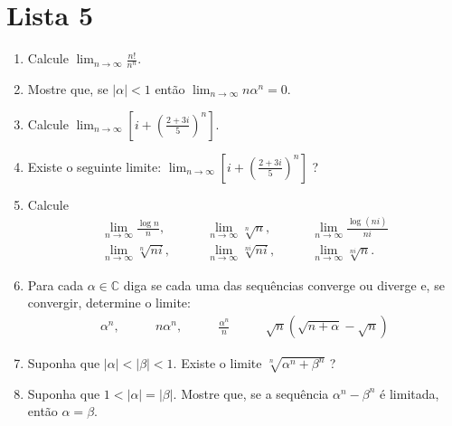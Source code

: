 \chapter*{Lista 5}



\begin{enumerate}[leftmargin=*]


	\item Calcule $\displaystyle \lim_{n\to\infty} \frac{n!}{n^n}$.

	\item Mostre que, se $|\alpha|<1$ então $\displaystyle\lim_{n\to\infty}n\alpha^n=0$.

	\item Calcule $\displaystyle \lim_{n\to\infty}\left[i+\left(\frac{2+3i}{5}\right)^n \right]$.

	\item Existe o seguinte limite: $\displaystyle \lim_{n\to\infty}\left[i+\left(\frac{2+3i}{5}\right)^n \right]$ ?



	\item Calcule
		\begin{eqnarray*}
			\lim_{n\to\infty} \frac{\log n}{n},
			&\qquad\displaystyle\lim_{n\to\infty} \sqrt[n]{n},	
			&\qquad\lim_{n\to\infty}\frac{\log(ni)}{ni}
			\\[0.3cm]
			\lim_{n\to\infty} \sqrt[n]{ni},
			&\qquad\displaystyle\lim_{n\to\infty} \sqrt[ni]{ni},		
			&\qquad\lim_{n\to\infty} \sqrt[ni]{n}.
		\end{eqnarray*}
		
	\item Para cada $\alpha\in\mathbb{C}$ diga se cada uma das sequências converge ou diverge e, 
			se convergir, determine o limite:
			$$
			\begin{array}{llll}
				\alpha^n,
				&\qquad\displaystyle n\alpha^n,	
				&\qquad\displaystyle \frac{\alpha^n}{n}
				&\qquad\displaystyle \sqrt{n}\left(\sqrt{n+\alpha}-\sqrt{n}\right)
			\end{array}	
			$$
 
 	\item Suponha que $|\alpha|<|\beta|<1$. Existe o limite $\displaystyle \sqrt[n]{\alpha^n+\beta^n}$ ?
 
 	\item Suponha que $1<|\alpha|=|\beta|$. Mostre que, se a sequência $\alpha^n-\beta^n$ 
 		é limitada, então $\alpha=\beta$.


\end{enumerate}
